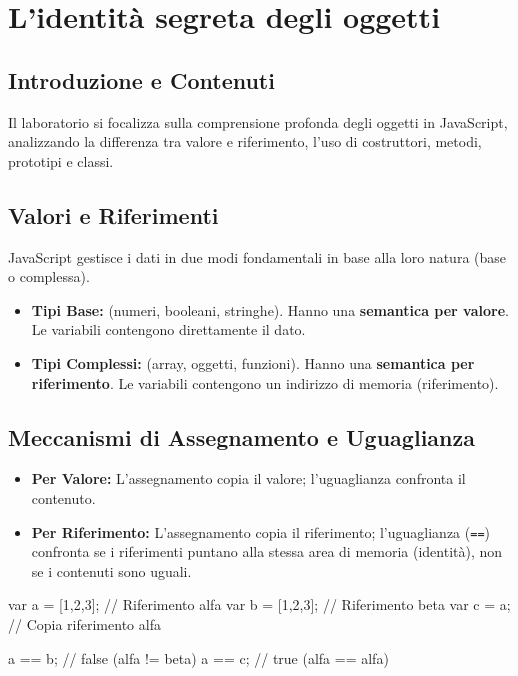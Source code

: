 \section{L'identità segreta degli oggetti}

\subsection{Introduzione e Contenuti}
Il laboratorio si focalizza sulla comprensione profonda degli oggetti in JavaScript, analizzando la differenza tra valore e riferimento, l'uso di costruttori, metodi, prototipi e classi.

\subsection{Valori e Riferimenti}
JavaScript gestisce i dati in due modi fondamentali in base alla loro natura (base o complessa).

\begin{definition}
    \begin{itemize}
        \item \textbf{Tipi Base:} (numeri, booleani, stringhe). Hanno una \textbf{semantica per valore}. Le variabili contengono direttamente il dato.
        \item \textbf{Tipi Complessi:} (array, oggetti, funzioni). Hanno una \textbf{semantica per riferimento}. Le variabili contengono un indirizzo di memoria (riferimento).
    \end{itemize}
\end{definition}

\subsection{Meccanismi di Assegnamento e Uguaglianza}
\begin{itemize}
    \item \textbf{Per Valore:} L'assegnamento copia il valore; l'uguaglianza confronta il contenuto.
    \item \textbf{Per Riferimento:} L'assegnamento copia il riferimento; l'uguaglianza (\texttt{==}) confronta se i riferimenti puntano alla stessa area di memoria (identità), non se i contenuti sono uguali.
\end{itemize}

\begin{jsbox}
var a = [1,2,3]; // Riferimento alfa
var b = [1,2,3]; // Riferimento beta
var c = a;       // Copia riferimento alfa

a == b; // false (alfa != beta)
a == c; // true  (alfa == alfa)
\end{jsbox}

